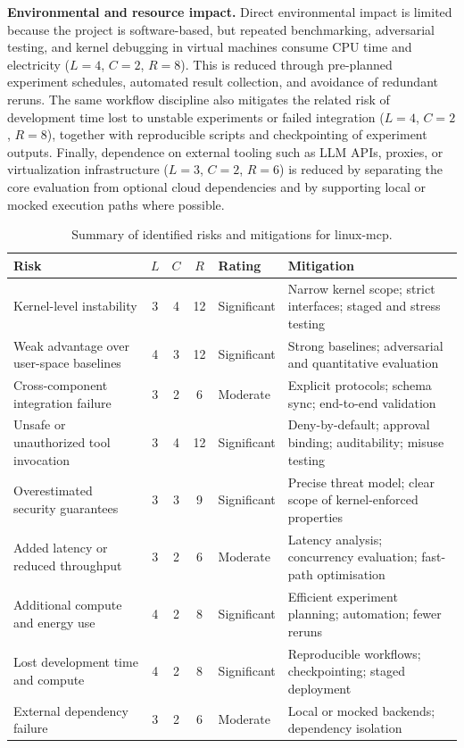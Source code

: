 \textbf{Environmental and resource impact.}
Direct environmental impact is limited because the project is software-based, but repeated benchmarking, adversarial testing, and kernel debugging in virtual machines consume CPU time and electricity ($L=4$, $C=2$, $R=8$).
This is reduced through pre-planned experiment schedules, automated result collection, and avoidance of redundant reruns.
The same workflow discipline also mitigates the related risk of development time lost to unstable experiments or failed integration ($L=4$, $C=2$, $R=8$), together with reproducible scripts and checkpointing of experiment outputs.
Finally, dependence on external tooling such as LLM APIs, proxies, or virtualization infrastructure ($L=3$, $C=2$, $R=6$) is reduced by separating the core evaluation from optional cloud dependencies and by supporting local or mocked execution paths where possible.

\begin{table}[h]
\centering
\small
\caption{Summary of identified risks and mitigations for linux-mcp.}
\setlength{\tabcolsep}{4pt}
\renewcommand{\arraystretch}{1.05}
\begin{tabular}{p{3.9cm} c c c p{1.8cm} p{5.9cm}}
\hline
\textbf{Risk} & $L$ & $C$ & $R$ & \textbf{Rating} & \textbf{Mitigation} \\
\hline
Kernel-level instability & 3 & 4 & 12 & Significant & Narrow kernel scope; strict interfaces; staged and stress testing \\
Weak advantage over user-space baselines & 4 & 3 & 12 & Significant & Strong baselines; adversarial and quantitative evaluation \\
Cross-component integration failure & 3 & 2 & 6 & Moderate & Explicit protocols; schema sync; end-to-end validation \\
Unsafe or unauthorized tool invocation & 3 & 4 & 12 & Significant & Deny-by-default; approval binding; auditability; misuse testing \\
Overestimated security guarantees & 3 & 3 & 9 & Significant & Precise threat model; clear scope of kernel-enforced properties \\
Added latency or reduced throughput & 3 & 2 & 6 & Moderate & Latency analysis; concurrency evaluation; fast-path optimisation \\
Additional compute and energy use & 4 & 2 & 8 & Significant & Efficient experiment planning; automation; fewer reruns \\
Lost development time and compute & 4 & 2 & 8 & Significant & Reproducible workflows; checkpointing; staged deployment \\
External dependency failure & 3 & 2 & 6 & Moderate & Local or mocked backends; dependency isolation \\
\hline
\end{tabular}
\label{tab:risk_assessment}
\end{table}
